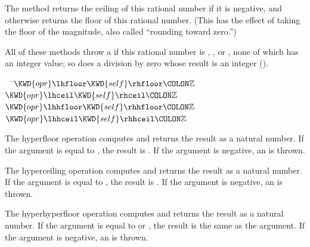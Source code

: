 The method  returns the ceiling of this rational number if it is
negative, and otherwise returns the floor of this rational number.
(This has the effect of taking the floor of the magnitude, also called
``rounding toward zero.'')

All of these methods throw a  if this rational number is
\EXP{+\infty}, \EXP{-\infty}, or , none of which has an integer value;
so does a division by zero whose result is an integer ().


\begin{Fortress}
{\tt~~}\pushtabs\=\+\(  \KWD{opr} \lhfloor \mathord{\KWD{self}} \rhfloor\COLON \mathbb{Z}\)\\
\(  \KWD{opr} \lhceil \mathord{\KWD{self}} \rhceil\COLON \mathbb{Z}\)\\
\(  \KWD{opr} \lhhfloor \mathord{\KWD{self}} \rhhfloor\COLON \mathbb{Z}\)\\
\(  \KWD{opr} \lhhceil \mathord{\KWD{self}} \rhhceil\COLON \mathbb{Z}\)\-\\\poptabs
\end{Fortress}

The hyperfloor operation  computes 
and returns the result as a natural number.
If the argument is equal to , the result is .
If the argument is negative, an  is thrown.

The hyperceiling operation  computes 
and returns the result as a natural number.
If the argument is equal to , the result is .
If the argument is negative, an  is thrown.

The hyperhyperfloor operation  computes 
and returns the result as a natural number.
If the argument is equal to  or , the result is the same as the argument.
If the argument is negative, an  is thrown.

